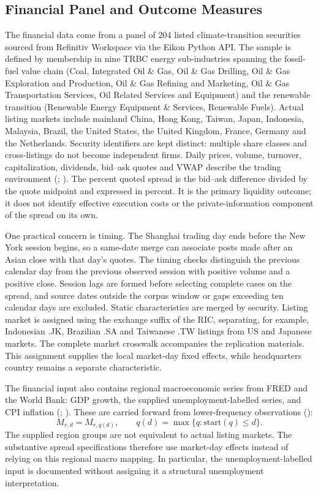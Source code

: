 \documentclass{article}
\theoremstyle{plain}
\begin{document}
\subsection{Financial Panel and Outcome Measures}
\label{sec:data_financial}

The financial data come from a panel of 204 listed climate-transition securities sourced from Refinitiv Workspace via the Eikon Python API. The sample is defined by membership in nine TRBC energy sub-industries spanning the fossil-fuel value chain (Coal, Integrated Oil \& Gas, Oil \& Gas Drilling, Oil \& Gas Exploration and Production, Oil \& Gas Refining and Marketing, Oil \& Gas Transportation Services, Oil Related Services and Equipment) and the renewable transition (Renewable Energy Equipment \& Services, Renewable Fuels). Actual listing markets include mainland China, Hong Kong, Taiwan, Japan, Indonesia, Malaysia, Brazil, the United States, the United Kingdom, France, Germany and the Netherlands. Security identifiers are kept distinct: multiple share classes and cross-listings do not become independent firms. Daily prices, volume, turnover, capitalization, dividends, bid--ask quotes and VWAP describe the trading environment (\cite{Karpoff1987}; \cite{Parkinson1980}). The percent quoted spread is the bid--ask difference divided by the quote midpoint and expressed in percent. It is the primary liquidity outcome; it does not identify effective execution costs or the private-information component of the spread on its own.

One practical concern is timing. The Shanghai trading day ends before the New York session begins, so a same-date merge can associate posts made after an Asian close with that day's quotes. The timing checks distinguish the previous calendar day from the previous observed session with positive volume and a positive close. Session lags are formed before selecting complete cases on the spread, and source dates outside the corpus window or gaps exceeding ten calendar days are excluded. Static characteristics are merged by security. Listing market is assigned using the exchange suffix of the RIC, separating, for example, Indonesian .JK, Brazilian .SA and Taiwanese .TW listings from US and Japanese markets. The complete market crosswalk accompanies the replication materials. This assignment supplies the local market-day fixed effects, while headquarters country remains a separate characteristic.

The financial input also contains regional macroeconomic series from FRED and the World Bank: GDP growth, the supplied unemployment-labelled series, and CPI inflation (\cite{FederalReserveBankofStLouis2025}; \cite{WorldBank2025}). These are carried forward from lower-frequency observations (\cite{StockWatson2008}):
\begin{equation}
M_{r,d}=M_{r,q(d)},\qquad q(d)=\max\{q:\mathrm{start}(q)\leq d\}.
\end{equation}
The supplied region groups are not equivalent to actual listing markets. The substantive spread specifications therefore use market-day effects instead of relying on this regional macro mapping. In particular, the unemployment-labelled input is documented without assigning it a structural unemployment interpretation.
\end{document}
